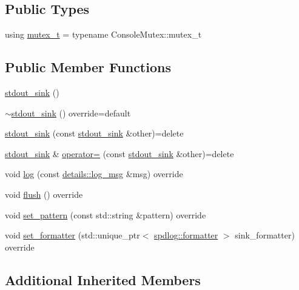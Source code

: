 \subsection*{Public Types}
\begin{DoxyCompactItemize}
\item 
using \hyperlink{classspdlog_1_1sinks_1_1stdout__sink_a8546278774f901c3b5159876154e2eea}{mutex\+\_\+t} = typename Console\+Mutex\+::mutex\+\_\+t
\end{DoxyCompactItemize}
\subsection*{Public Member Functions}
\begin{DoxyCompactItemize}
\item 
\hyperlink{classspdlog_1_1sinks_1_1stdout__sink_aadb52e8ba9e2992f847c46ec521b4407}{stdout\+\_\+sink} ()
\item 
\hyperlink{classspdlog_1_1sinks_1_1stdout__sink_ae0e434d7d55f6ec9c05ff308bc8e673b}{$\sim$stdout\+\_\+sink} () override=default
\item 
\hyperlink{classspdlog_1_1sinks_1_1stdout__sink_ab7761f533c069ef52a256573de29077d}{stdout\+\_\+sink} (const \hyperlink{classspdlog_1_1sinks_1_1stdout__sink}{stdout\+\_\+sink} \&other)=delete
\item 
\hyperlink{classspdlog_1_1sinks_1_1stdout__sink}{stdout\+\_\+sink} \& \hyperlink{classspdlog_1_1sinks_1_1stdout__sink_a0bee23de61cbea7c1dfb5e8712a98d74}{operator=} (const \hyperlink{classspdlog_1_1sinks_1_1stdout__sink}{stdout\+\_\+sink} \&other)=delete
\item 
void \hyperlink{classspdlog_1_1sinks_1_1stdout__sink_adda1fffa1daf4565f72b3e94734d984a}{log} (const \hyperlink{structspdlog_1_1details_1_1log__msg}{details\+::log\+\_\+msg} \&msg) override
\item 
void \hyperlink{classspdlog_1_1sinks_1_1stdout__sink_af3a13cc82215681bdd7ca5e33a7c28b5}{flush} () override
\item 
void \hyperlink{classspdlog_1_1sinks_1_1stdout__sink_a5b8759dab80ca44e9d185e21aa797d2a}{set\+\_\+pattern} (const std\+::string \&pattern) override
\item 
void \hyperlink{classspdlog_1_1sinks_1_1stdout__sink_ada2b3ef5a7821873df46ebda72b77e6c}{set\+\_\+formatter} (std\+::unique\+\_\+ptr$<$ \hyperlink{classspdlog_1_1formatter}{spdlog\+::formatter} $>$ sink\+\_\+formatter) override
\end{DoxyCompactItemize}
\subsection*{Additional Inherited Members}


